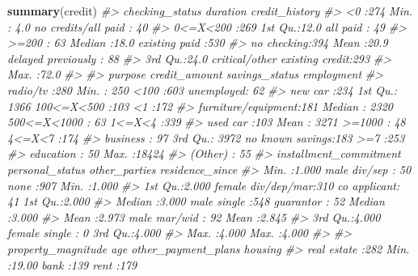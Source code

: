 \documentclass[]{article}
\newenvironment{Shaded}{\begin{snugshade}}{\end{snugshade}}
\newcommand{\CommentTok}[1]{\textcolor[rgb]{0.56,0.35,0.01}{\textit{#1}}}
\newcommand{\KeywordTok}[1]{\textcolor[rgb]{0.13,0.29,0.53}{\textbf{#1}}}
\newcommand{\NormalTok}[1]{#1}
\begin{document}
\begin{Shaded}
\begin{Highlighting}[]
\KeywordTok{summary}\NormalTok{(credit)}
\CommentTok{#>     checking_status    duration                           credit_history}
\CommentTok{#>  <0         :274    Min.   : 4.0   no credits/all paid           : 40   }
\CommentTok{#>  0<=X<200   :269    1st Qu.:12.0   all paid                      : 49   }
\CommentTok{#>  >=200      : 63    Median :18.0   existing paid                 :530   }
\CommentTok{#>  no checking:394    Mean   :20.9   delayed previously            : 88   }
\CommentTok{#>                     3rd Qu.:24.0   critical/other existing credit:293   }
\CommentTok{#>                     Max.   :72.0                                        }
\CommentTok{#>                                                                         }
\CommentTok{#>                 purpose    credit_amount            savings_status      employment }
\CommentTok{#>  radio/tv           :280   Min.   :  250   <100            :603    unemployed: 62  }
\CommentTok{#>  new car            :234   1st Qu.: 1366   100<=X<500      :103    <1        :172  }
\CommentTok{#>  furniture/equipment:181   Median : 2320   500<=X<1000     : 63    1<=X<4    :339  }
\CommentTok{#>  used car           :103   Mean   : 3271   >=1000          : 48    4<=X<7    :174  }
\CommentTok{#>  business           : 97   3rd Qu.: 3972   no known savings:183    >=7       :253  }
\CommentTok{#>  education          : 50   Max.   :18424                                           }
\CommentTok{#>  (Other)            : 55                                                           }
\CommentTok{#>  installment_commitment           personal_status      other_parties residence_since}
\CommentTok{#>  Min.   :1.000          male div/sep      : 50    none        :907   Min.   :1.000  }
\CommentTok{#>  1st Qu.:2.000          female div/dep/mar:310    co applicant: 41   1st Qu.:2.000  }
\CommentTok{#>  Median :3.000          male single       :548    guarantor   : 52   Median :3.000  }
\CommentTok{#>  Mean   :2.973          male mar/wid      : 92                       Mean   :2.845  }
\CommentTok{#>  3rd Qu.:4.000          female single     :  0                       3rd Qu.:4.000  }
\CommentTok{#>  Max.   :4.000                                                       Max.   :4.000  }
\CommentTok{#>                                                                                     }
\CommentTok{#>          property_magnitude      age        other_payment_plans     housing   }
\CommentTok{#>  real estate      :282      Min.   :19.00   bank  :139          rent    :179  }

\end{Highlighting}
\end{Shaded}
\end{document}
